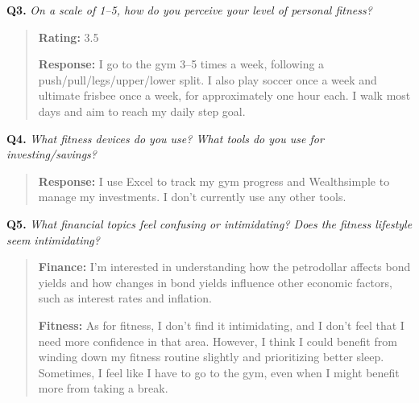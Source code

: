 \documentclass[12pt]{article}
\begin{document}
\medskip
\noindent\textbf{Q3.} \textit{On a scale of 1--5, how do you perceive your level of personal fitness?}

\begin{quote}
\textbf{Rating:} 3.5\par
\textbf{Response:} I go to the gym 3--5 times a week, following a push/pull/legs/upper/lower split. I also play soccer once a week and ultimate frisbee once a week, for approximately one hour each. I walk most days and aim to reach my daily step goal.\par
\end{quote}

\medskip
\noindent\textbf{Q4.} \textit{What fitness devices do you use? What tools do you use for investing/savings?}

\begin{quote}
\textbf{Response:} I use Excel to track my gym progress and Wealthsimple to manage my investments. I don't currently use any other tools.\par
\end{quote}

\medskip
\noindent\textbf{Q5.} \textit{What financial topics feel confusing or intimidating? Does the fitness lifestyle seem intimidating?}

\begin{quote}
\textbf{Finance:} I'm interested in understanding how the petrodollar affects bond yields and how changes in bond yields influence other economic factors, such as interest rates and inflation.\par
\textbf{Fitness:} As for fitness, I don't find it intimidating, and I don't feel that I need more confidence in that area. However, I think I could benefit from winding down my fitness routine slightly and prioritizing better sleep. Sometimes, I feel like I have to go to the gym, even when I might benefit more from taking a break.\par
\end{quote}
\end{document}
